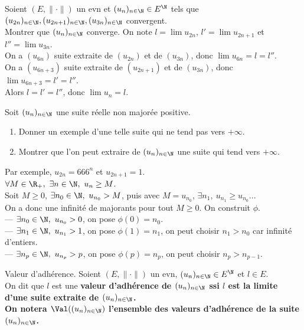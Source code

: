 \documentclass[11pt]{article}
\begin{document}
\vspace*{-0.7cm}

\begin{ex}{}{}
    Soient $(E,\|\cdot\|)$ un evn et $(u_n)_{n\in\N}\in E^\N$ tels que $(u_{2n})_{n\in\N}, (u_{2n+1})_{n\in\N}, (u_{3n})_{n\in\N}$ convergent.\\
    Montrer que $(u_n)_{n\in\N}$ converge.
    \tcblower
    On note $l=\lim u_{2n}$, $l'=\lim u_{2n+1}$ et $l''=\lim u_{3n}$.\\
    On a $(u_{6n})$ suite extraite de $(u_{2n})$ et de $(u_{3n})$, donc $\lim u_{6n}=l=l''$.\\
    On a $(u_{6n+3})$ suite extraite de $(u_{2n+1})$ et de $(u_{3n})$, donc $\lim u_{6n+3}=l'=l''$.\\
    Alors $l=l'=l''$, donc $\lim u_n = l$.
\end{ex}

\vspace*{-0.7cm}

\begin{ex}{}{}
    Soit $(u_n)_{n\in\N}$ une suite réelle non majorée positive.
    \begin{enumerate}
        \item Donner un exemple d'une telle suite qui ne tend pas vers $+\infty$.
        \item Montrer que l'on peut extraire de $(u_n)_{n\in\N}$ une suite qui tend vers $+\infty$.
    \end{enumerate}
    \tcblower
     Par exemple, $u_{2n}=666^n$ et $u_{2n+1}=1$.\\
     $\forall M \in \R_+, ~ \exists n \in \N, ~ u_n \geq M$.\\
    Soit $M\geq0$, $\exists n_0 \in \N, ~ u_{n_0}>M$, puis avec $M=u_{n_0}$, $\exists n_1, ~ u_{n_1}\geq u_{n_0}$...\\
    On a donc une infinité de majorants pour tout $M\geq0$. On construit $\phi$.\\
    --- $\exists n_0 \in \N, ~ u_{n_0}>0$, on pose $\phi(0)=n_0$.\\
    --- $\exists n_1 \in \N, ~ u_{n_1}>1$, on pose $\phi(1)=n_1$, on peut choisir $n_1>n_0$ car infinité d'entiers.\\
    --- $\exists n_p \in \N, ~ u_{n_p}>p$, on pose $\phi(p)=n_p$, on peut choisir $n_p>n_{p-1}$.
\end{ex}

\vspace*{-0.7cm}

\begin{defi}{Valeur d'adhérence.}{}
    Soient $(E,\|\cdot\|)$ un evn, $(u_n)_{n\in\N}\in E^\N$ et $l\in E$.\\
    On dit que $l$ est une \bf{valeur d'adhérence} de $(u_n)_{n\in\N}$ ssi $l$ est la limite d'une suite extraite de $(u_n)_{n\in\N}$.\\
    On notera $\Val((u_n)_{n\in\N})$ l'ensemble des valeurs d'adhérence de la suite $(u_n)_{n\in\N}$.
\end{defi}
\end{document}
